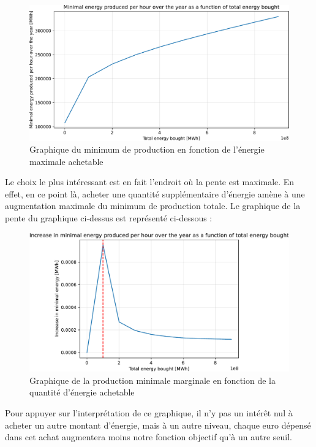 \documentclass{article}
\begin{document}
\begin{figure}[h!]
    \centering
    \includegraphics[scale=0.5]{Images/Partie_1/Q2/minimal_energy_produced.pdf}
    \caption{Graphique du minimum de production en fonction de l'énergie maximale achetable}
    \label{fig:minimal_energy_produced_Q2}
\end{figure}
\noindent

Le choix le plus intéressant est en fait l'endroit où la pente est maximale. En effet, en ce point là, acheter une quantité supplémentaire d'énergie amène à une augmentation maximale du minimum de production totale. Le graphique de la pente du graphique ci-dessus est représenté ci-dessous :

\begin{figure}[h!]
    \centering
    \includegraphics[scale=0.5]{Images/Partie_1/Q2/increase_minimal_energy_produced.pdf}
    \caption{Graphique de la production minimale marginale en fonction de la quantité d'énergie achetable}
    \label{fig:increase_minimal_production_Q2}
\end{figure}
Pour appuyer sur l'interprétation de ce graphique, il n'y pas un intérêt nul à acheter un autre montant d'énergie, mais à un autre niveau, chaque euro dépensé dans cet achat augmentera moins notre fonction objectif qu'à un autre seuil.
\end{document}
